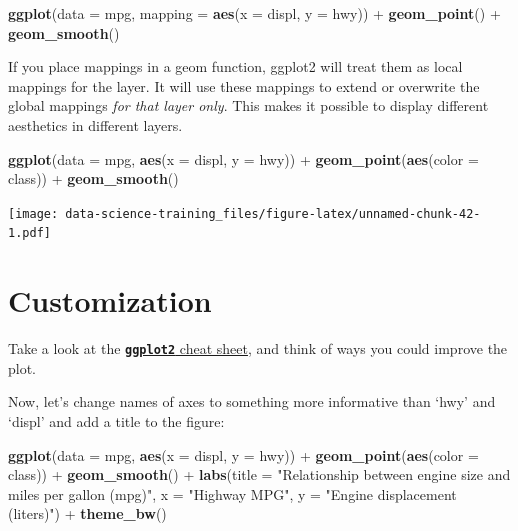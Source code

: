 \documentclass[]{book}
\newenvironment{Shaded}{\begin{snugshade}}{\end{snugshade}}
\newcommand{\KeywordTok}[1]{\textcolor[rgb]{0.13,0.29,0.53}{\textbf{{#1}}}}
\newcommand{\DataTypeTok}[1]{\textcolor[rgb]{0.13,0.29,0.53}{{#1}}}
\newcommand{\StringTok}[1]{\textcolor[rgb]{0.31,0.60,0.02}{{#1}}}
\newcommand{\NormalTok}[1]{{#1}}
\theoremstyle{definition}
\theoremstyle{definition}
\theoremstyle{definition}
\theoremstyle{remark}
\begin{document}
\begin{Shaded}
\begin{Highlighting}[]
\KeywordTok{ggplot}\NormalTok{(}\DataTypeTok{data =} \NormalTok{mpg, }\DataTypeTok{mapping =} \KeywordTok{aes}\NormalTok{(}\DataTypeTok{x =} \NormalTok{displ, }\DataTypeTok{y =} \NormalTok{hwy)) +}\StringTok{ }
\StringTok{  }\KeywordTok{geom_point}\NormalTok{() +}\StringTok{ }
\StringTok{  }\KeywordTok{geom_smooth}\NormalTok{()}
\end{Highlighting}
\end{Shaded}

If you place mappings in a geom function, ggplot2 will treat them as
local mappings for the layer. It will use these mappings to extend or
overwrite the global mappings \emph{for that layer only}. This makes it
possible to display different aesthetics in different layers.

\begin{Shaded}
\begin{Highlighting}[]
\KeywordTok{ggplot}\NormalTok{(}\DataTypeTok{data =} \NormalTok{mpg, }\KeywordTok{aes}\NormalTok{(}\DataTypeTok{x =} \NormalTok{displ, }\DataTypeTok{y =} \NormalTok{hwy)) +}\StringTok{ }
\StringTok{  }\KeywordTok{geom_point}\NormalTok{(}\KeywordTok{aes}\NormalTok{(}\DataTypeTok{color =} \NormalTok{class)) +}\StringTok{ }
\StringTok{  }\KeywordTok{geom_smooth}\NormalTok{()}
\end{Highlighting}
\end{Shaded}

\texttt{[image: data-science-training\_files/figure-latex/unnamed-chunk-42-1.pdf]}

\section{Customization}\label{customization}

Take a look at the
\href{https://www.rstudio.com/wp-content/uploads/2016/11/ggplot2-cheatsheet-2.1.pdf}{\textbf{\texttt{ggplot2}}
cheat sheet}, and think of ways you could improve the plot.

Now, let's change names of axes to something more informative than `hwy'
and `displ' and add a title to the figure:

\begin{Shaded}
\begin{Highlighting}[]
\KeywordTok{ggplot}\NormalTok{(}\DataTypeTok{data =} \NormalTok{mpg, }\KeywordTok{aes}\NormalTok{(}\DataTypeTok{x =} \NormalTok{displ, }\DataTypeTok{y =} \NormalTok{hwy)) +}\StringTok{ }
\StringTok{  }\KeywordTok{geom_point}\NormalTok{(}\KeywordTok{aes}\NormalTok{(}\DataTypeTok{color =} \NormalTok{class)) +}\StringTok{ }
\StringTok{  }\KeywordTok{geom_smooth}\NormalTok{() +}
\StringTok{  }\KeywordTok{labs}\NormalTok{(}\DataTypeTok{title =} \StringTok{"Relationship between engine size and miles per gallon (mpg)"}\NormalTok{,}
         \DataTypeTok{x =} \StringTok{"Highway MPG"}\NormalTok{,}
         \DataTypeTok{y =} \StringTok{"Engine displacement (liters)"}\NormalTok{) +}
\StringTok{  }\KeywordTok{theme_bw}\NormalTok{()}
\end{Highlighting}
\end{Shaded}
\end{document}
